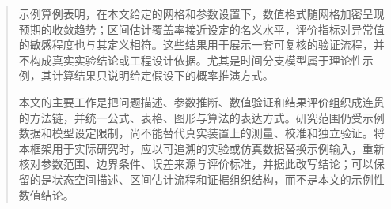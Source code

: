 \begin{abstract}
示例算例表明，在本文给定的网格和参数设置下，数值格式随网格加密呈现预期的收敛趋势；区间估计覆盖率接近设定的名义水平，评价指标对异常值的敏感程度也与其定义相符。这些结果用于展示一套可复核的验证流程，并不构成真实实验结论或工程设计依据。尤其是时间分支模型属于理论性示例，其计算结果只说明给定假设下的概率推演方式。

本文的主要工作是把问题描述、参数推断、数值验证和结果评价组织成连贯的方法链，并统一公式、表格、图形与算法的表达方式。研究范围仍受示例数据和模型设定限制，尚不能替代真实装置上的测量、校准和独立验证。将本框架用于实际研究时，应以可追溯的实验或仿真数据替换示例输入，重新核对参数范围、边界条件、误差来源与评价标准，并据此改写结论；可以保留的是状态空间描述、区间估计流程和证据组织结构，而不是本文的示例性数值结论。


\end{abstract}


